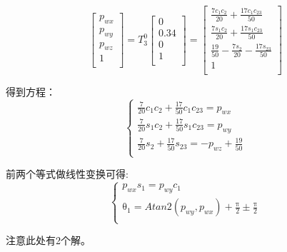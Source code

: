\begin{equation}
    \left[ \begin{array}{c}	p_{wx}\\	p_{wy}\\	p_{wz}\\	1\\\end{array} \right] =T_{3}^{0}\left[ \begin{array}{c}	0\\	0.34\\	0\\	1\\\end{array} \right] =\left[ \begin{array}{c}	\frac{7c_1c_2}{20}+\frac{17c_1c_{23}}{50}\\	\frac{7s_1c_2}{20}+\frac{17s_1c_{23}}{50}\\	\frac{19}{50}-\frac{7s_2}{20}-\frac{17s_{23}}{50}\\	1\\\end{array} \right] 
\end{equation}

得到方程：
\begin{equation}
    \left\{ \begin{array}{c}	\mathrm{    }\frac{7}{20}c_1c_2+\frac{17}{50}c_1c_{23}=p_{wx}\\	\mathrm{    }\frac{7}{20}s_1c_2+\frac{17}{50}s_1c_{23}=p_{wy}\mathrm{ }\\	\mathrm{    }\frac{7}{20}s_2+\frac{17}{50}s_{23}=-p_{wz}+\frac{19}{50}\\\end{array} \right.
\end{equation}

前两个等式做线性变换可得:
\begin{equation}
    \left\{ \begin{array}{c}	\mathrm{    }p_{wx}s_1=p_{wy}c_1\\	\mathrm{    \theta}_1=Atan2\left( p_{wy},p_{wx} \right) +\frac{\mathrm{\pi}}{2}\pm \frac{\mathrm{\pi}}{2}\\\end{array} \right. 
\end{equation}

注意此处有2个解。

